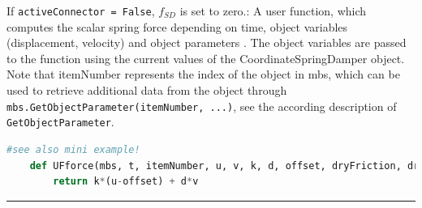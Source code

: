     If \texttt{activeConnector = False}, $f_{SD}$ is set to zero.:
    A user function, which computes the scalar spring force depending on time, object variables (displacement, velocity) 
    and object parameters .
    The object variables are passed to the function using the current values of the CoordinateSpringDamper object.
    Note that itemNumber represents the index of the object in mbs, which can be used to retrieve additional data from the object through
    \texttt{mbs.GetObjectParameter(itemNumber, ...)}, see the according description of \texttt{GetObjectParameter}.
    \finishTable
    \userFunctionExample{}
    \pythonstyle
    \begin{lstlisting}[language=Python]
    #see also mini example!
    def UFforce(mbs, t, itemNumber, u, v, k, d, offset, dryFriction, dryFrictionProportionalZone): 
        return k*(u-offset) + d*v
    \end{lstlisting}
\vspace{6pt}\par\noindent\rule{\textwidth}{0.4pt}
\label{miniExample_ObjectConnectorCoordinateSpringDamper}
\pythonstyle
